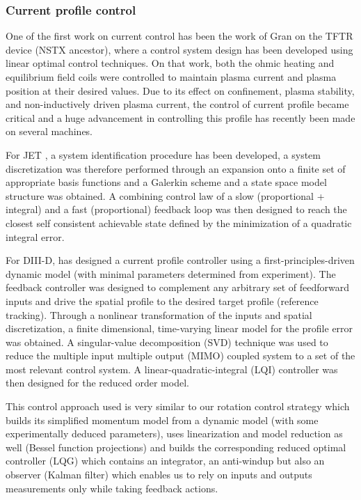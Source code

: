 \documentclass[12pt,lot, lof]{puthesis}
\begin{document}
\subsubsection{Current profile control}
One of the first work on current control has been the work of Gran \cite{Gran77} on the TFTR device (NSTX ancestor), where a control system design has been developed using linear optimal control techniques. On that work, both the ohmic heating and equilibrium field coils were controlled to maintain plasma current and plasma position at their desired values.
Due to its effect on confinement, plasma stability, and non-inductively driven plasma current, the control of current profile became critical and a huge advancement in controlling this profile has recently been made on several machines.

For JET \cite{Moreau03, Moreau08, Laborde05}, a system identification procedure has been developed, a system discretization was therefore performed through an expansion onto a finite set of appropriate basis functions and a Galerkin scheme and a state space model structure was obtained. A combining control law of a slow (proportional + integral) and a fast (proportional) feedback loop was then designed to reach the closest self consistent achievable state defined by the minimization of a quadratic integral error.

For DIII-D, \cite{ Boyer13} has designed a current profile controller using a first-principles-driven dynamic model (with minimal parameters determined from experiment). The feedback controller was designed to complement any arbitrary set of feedforward inputs and drive the spatial profile to the desired target profile (reference tracking). Through a nonlinear transformation of the inputs and spatial discretization, a finite dimensional, time-varying linear model for the profile error was obtained. A singular-value decomposition (SVD) technique was used to reduce the multiple input multiple output (MIMO) coupled system to a set of the most relevant control system. A linear-quadratic-integral (LQI) controller was then designed for the reduced order model. 

This control approach used is very similar to our rotation control strategy which builds its simplified momentum model from a dynamic model (with some experimentally deduced parameters), uses linearization and model reduction as well (Bessel function projections) and builds the corresponding reduced optimal controller (LQG) which contains an integrator, an anti-windup but also an observer (Kalman filter) which enables us to rely on inputs and outputs measurements only while taking feedback actions.
\end{document}
